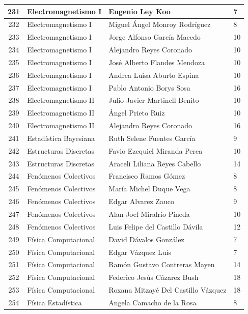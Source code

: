 {\begin{longtable}{|c|p{6.5cm}|p{5cm}|p{1.5cm}|}
  231 & Electromagnetismo I & Eugenio Ley Koo & 7 \\ \hline 
  232 & Electromagnetismo I & Miguel Ángel Monroy Rodríguez & 8 \\ \hline 
  233 & Electromagnetismo I & Jorge Alfonso García Macedo & 10 \\ \hline 
  234 & Electromagnetismo I & Alejandro Reyes Coronado & 10 \\ \hline 
  235 & Electromagnetismo I & José Alberto Flandes Mendoza & 10 \\ \hline 
  236 & Electromagnetismo I & Andrea Luisa Aburto Espina & 10 \\ \hline 
  237 & Electromagnetismo I & Pablo Antonio Borys Sosa & 16 \\ \hline 
  238 & Electromagnetismo II & Julio Javier Martinell Benito & 10 \\ \hline 
  239 & Electromagnetismo II & Ángel Prieto Ruiz & 10 \\ \hline 
  240 & Electromagnetismo II & Alejandro Reyes Coronado & 16 \\ \hline 
  241 & Estadística Bayesiana & Ruth Selene Fuentes García & 9 \\ \hline 
  242 & Estructuras Discretas & Favio Ezequiel Miranda Perea & 10 \\ \hline 
  243 & Estructuras Discretas & Araceli Liliana Reyes Cabello & 14 \\ \hline 
  244 & Fenómenos Colectivos & Francisco Ramos Gómez & 8 \\ \hline 
  245 & Fenómenos Colectivos & María Michel Duque Vega & 8 \\ \hline 
  246 & Fenómenos Colectivos & Edgar Alvarez Zauco & 9 \\ \hline 
  247 & Fenómenos Colectivos & Alan Joel Miralrio Pineda & 10 \\ \hline 
  248 & Fenómenos Colectivos & Luis Felipe del Castillo Dávila & 12 \\ \hline 
  249 & Física Computacional & David Dávalos González & 7 \\ \hline 
  250 & Física Computacional & Edgar Vázquez Luis & 7 \\ \hline 
  251 & Física Computacional & Ramón Gustavo Contreras Mayen & 14 \\ \hline 
  252 & Física Computacional & Federico Jesús Cázarez Bush & 18 \\ \hline 
  253 & Física Computacional & Roxana Mitzayé Del Castillo Vázquez & 18 \\ \hline 
  254 & Física Estadística & Angela Camacho de la Rosa & 8 \\ \hline 

\end{longtable}}
